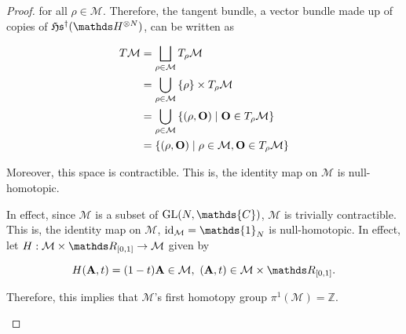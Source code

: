 \documentclass{homework}
\begin{document}
\begin{proof}
for all $\rho \in \mathcal{M}$. Therefore, the tangent bundle, a vector bundle made up of copies of $\mathfrak{H}\mathfrak{s}^{\dagger}(\hilbert^{\otimes N})$, can be written as 

$$
    {\displaystyle {\begin{aligned}T\mathcal{M}&=\bigsqcup _{\rho \in \mathcal{M}}T_{\rho}\mathcal{M}\\&=\bigcup _{\rho\in \mathcal{M}}\left\{\rho\right\}\times T_{\rho}\mathcal{M}\\&=\bigcup_{\rho\in \mathcal{M}}\left\{(\rho,{\bf O})\mid {\bf O}\in T_{\rho} \mathcal{M}\right\}\\&=\left\{(\rho,{\bf O})\mid \rho\in \mathcal{M},{\bf O}\in T_{\rho} \mathcal{M}\right\}\end{aligned}}}
$$

Moreover, this space is contractible. This is, the identity map on $\mathcal{M}$ is null-homotopic. 

\begin{tcolorbox}[title = Proof of the contractible nature in the finite-dimensional case.]

In effect, since $\mathcal{M}$ is a subset of $\textnormal{GL}(N, \mathds{C})$, $\mathcal{M}$ is trivially contractible. This is, the identity map on $\mathcal{M}$, $\textnormal{id}_{\mathcal{M}} = \mathds{1}_{N}$ is null-homotopic. In effect, let $H: \mathcal{M} \times \R_{[0,1]} \rightarrow \mathcal{M}$ given by 

$$
    H({\bf A}, t) = (1-t){\bf A} \in \mathcal{M}, \blanky ({\bf A}, t) \in \mathcal{M} \times \R_{[0,1]}. 
$$

Therefore, this implies that $\mathcal{M}$'s first homotopy group $\pi^{1}(\mathcal{M}) = \mathds{Z}$.
\end{tcolorbox}
\end{proof}

\clearpage
\end{document}
